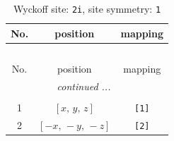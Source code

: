 \documentclass[fleqn,8pt]{jsarticle}
\begin{document}
\renewcommand{\arraystretch}{1.2}
\begin{longtable}{ccc}
\caption{Wyckoff site: {\tt 2i}, site symmetry: {\tt 1}}
 \\
 \hline \hline
No. & position & mapping \\ \hline \endfirsthead

\multicolumn{2}{l}{\tablename\ \thetable{}} \\
 \hline \hline
No. & position & mapping \\ \hline \endhead

 \hline \hline
\multicolumn{2}{r}{\footnotesize\it continued ...} \\ \endfoot

 \hline \hline
\multicolumn{2}{r}{} \\ \endlastfoot

1 & $\left[ x,\, y,\, z \right]$ & {\tt [1]} \\ \hline
2 & $\left[ - x,\, - y,\, - z \right]$ & {\tt [2]} \\
\end{longtable}
\end{document}
